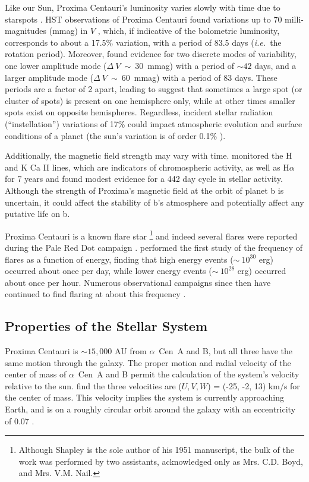 \documentclass[preprint,12pt]{aastex}
\def\ie{{\it i.e.\ }}
\def\acen{{$\alpha$~Cen}}
\begin{document}
Like our Sun, Proxima Centauri's luminosity varies slowly with time
due to starspots \citep{Benedict93}. HST observations of Proxima
Centauri found variations up to 70 milli-magnitudes (mmag) in $V$
\citep{Benedict98}, which, if indicative of the bolometric luminosity,
corresponds to about a 17.5\% variation, with a
period of 83.5 days (\ie the rotation period). Moreover,
\cite{Benedict98} found evidence for two discrete modes of
variability, one lower amplitude mode ($\Delta~V~\sim~30$~mmag) with a
period of $\sim 42$ days, and a larger amplitude mode
($\Delta~V~\sim~60$~mmag) with a period of 83 days. These periods are
a factor of 2 apart, leading \cite{Benedict98} to suggest that
sometimes a large spot (or cluster of spots) is present on one
hemisphere only, while at other times smaller spots exist on opposite
hemispheres. Regardless, incident stellar radiation (``instellation'')
variations of 17\% could impact atmospheric evolution and surface
conditions of a planet (the sun's variation is of order 0.1\%
\citep{Willson81}).

Additionally, the magnetic field strength may vary with
time. \cite{Cincunegui07} monitored the H and K Ca II lines, which are
indicators of chromospheric activity, as well as H$\alpha$ for 7 years
and found modest evidence for a 442 day cycle in stellar
activity. Although the strength of Proxima's magnetic field at the
orbit of planet b is uncertain, it could affect the stability of
b's atmosphere and potentially affect any putative life on b. 

Proxima Centauri is a known flare star
\citep{Shapley51}\footnote{Although Shapley is the sole author of his
  1951 manuscript, the bulk of the work was performed by two 
  assistants, acknowledged only as Mrs. C.D. Boyd, and Mrs. V.M. Nail.}  and indeed several flares
were reported during the Pale Red Dot campaign
\citep{AngladaEscude16}. \cite{Walker81} performed the first study of
the frequency of flares as a function of energy, finding that high
energy events ($\sim~10^{30}$ erg) occurred about once per day, while
lower energy events ($\sim~10^{28}$ erg) occurred about once per
hour. Numerous observational campaigns since then have continued to
find flaring at about this frequency
\citep{Benedict98,AngladaEscude16,Davenport16}.

\subsection{Properties of the Stellar System}
\label{sec:obs:stellarsys}
Proxima Centauri is $\sim 15,000$ AU from \acen~A and B, but all three
have the same motion through the galaxy. The proper motion and radial
velocity of the center of mass of \acen~A and B permit the calculation
of the system's velocity relative to the sun. \cite{Poveda96} find the
three velocities are ($U, V, W$) = (-25, -2, 13) km/s for the center
of mass. This velocity implies the system is currently approaching
Earth, and is on a roughly circular orbit around the galaxy with an
eccentricity of 0.07 \citep{AllenHerrera98}.
\end{document}

